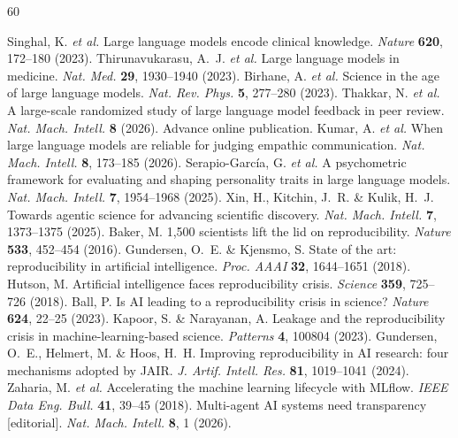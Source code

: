\documentclass[sn-nature]{sn-jnl}
\begin{document}
\begin{thebibliography}{60}

Singhal, K. \emph{et al.}
Large language models encode clinical knowledge.
\emph{Nature} \textbf{620}, 172--180 (2023).
Thirunavukarasu, A.~J. \emph{et al.}
Large language models in medicine.
\emph{Nat. Med.} \textbf{29}, 1930--1940 (2023).
Birhane, A. \emph{et al.}
Science in the age of large language models.
\emph{Nat. Rev. Phys.} \textbf{5}, 277--280 (2023).
Thakkar, N. \emph{et al.}
A large-scale randomized study of large language model feedback in peer review.
\emph{Nat. Mach. Intell.} \textbf{8} (2026). Advance online publication.
Kumar, A. \emph{et al.}
When large language models are reliable for judging empathic communication.
\emph{Nat. Mach. Intell.} \textbf{8}, 173--185 (2026).
Serapio-Garc\'{i}a, G. \emph{et al.}
A psychometric framework for evaluating and shaping personality traits in large language models.
\emph{Nat. Mach. Intell.} \textbf{7}, 1954--1968 (2025).
Xin, H., Kitchin, J.~R. \& Kulik, H.~J.
Towards agentic science for advancing scientific discovery.
\emph{Nat. Mach. Intell.} \textbf{7}, 1373--1375 (2025).
Baker, M.
1,500 scientists lift the lid on reproducibility.
\emph{Nature} \textbf{533}, 452--454 (2016).
Gundersen, O.~E. \& Kjensmo, S.
State of the art: reproducibility in artificial intelligence.
\emph{Proc. AAAI} \textbf{32}, 1644--1651 (2018).
Hutson, M.
Artificial intelligence faces reproducibility crisis.
\emph{Science} \textbf{359}, 725--726 (2018).
Ball, P.
Is AI leading to a reproducibility crisis in science?
\emph{Nature} \textbf{624}, 22--25 (2023).
Kapoor, S. \& Narayanan, A.
Leakage and the reproducibility crisis in machine-learning-based science.
\emph{Patterns} \textbf{4}, 100804 (2023).
Gundersen, O.~E., Helmert, M. \& Hoos, H.~H.
Improving reproducibility in AI research: four mechanisms adopted by JAIR.
\emph{J. Artif. Intell. Res.} \textbf{81}, 1019--1041 (2024).
Zaharia, M. \emph{et al.}
Accelerating the machine learning lifecycle with MLflow.
\emph{IEEE Data Eng. Bull.} \textbf{41}, 39--45 (2018).
Multi-agent AI systems need transparency [editorial].
\emph{Nat. Mach. Intell.} \textbf{8}, 1 (2026).

\end{thebibliography}
\end{document}
